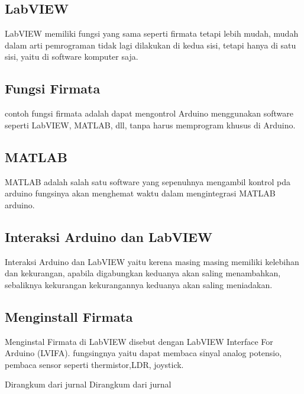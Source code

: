 	\subsection{LabVIEW}
	LabVIEW memiliki fungsi yang sama seperti firmata tetapi lebih mudah, mudah dalam arti pemrograman tidak lagi dilakukan di kedua sisi,
	tetapi hanya di satu sisi, yaitu di software komputer saja.
	
	\subsection{Fungsi Firmata}
	contoh fungsi firmata adalah dapat mengontrol Arduino menggunakan software seperti LabVIEW, MATLAB, dll, tanpa harus memprogram khusus di Arduino.
	
	\subsection{MATLAB}
	MATLAB adalah salah satu software yang sepenuhnya mengambil kontrol pda arduino fungsinya akan menghemat waktu dalam mengintegrasi MATLAB arduino.
	
	\subsection{Interaksi Arduino dan LabVIEW}
	Interaksi Arduino dan LabVIEW yaitu kerena masing masing memiliki kelebihan dan kekurangan, apabila digabungkan keduanya akan saling menambahkan,
	sebaliknya kekurangan kekurangannya keduanya akan saling meniadakan.
	
	\subsection{Menginstall Firmata}
	Menginstal Firmata di LabVIEW disebut dengan LabVIEW Interface For Arduino (LVIFA). fungsingnya yaitu dapat membaca sinyal analog potensio,
	pembaca sensor seperti thermistor,LDR, joystick.
	
	Dirangkum dari jurnal \cite{steiner2009firmata}
	Dirangkum dari jurnal \cite{majocchi2012arduino}